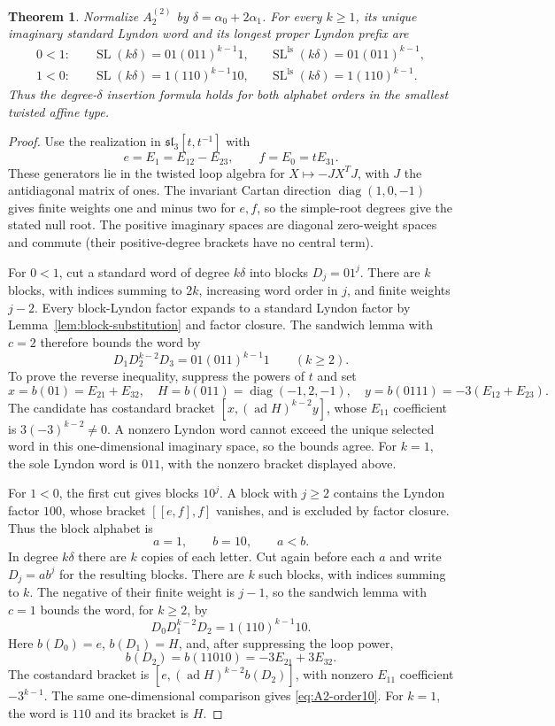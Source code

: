 \documentclass[11pt]{amsart}
\numberwithin{equation}{section}
\newtheorem{theorem}{Theorem}[section]
\theoremstyle{definition}
\DeclareMathOperator{\SL}{SL}
\DeclareMathOperator{\diag}{diag}
\DeclareMathOperator{\ad}{ad}
\newcommand{\br}[1]{b(#1)}
\newcommand{\ls}{\mathrm{ls}}
\begin{document}
\begin{theorem}\label{thm:A2twisted}
Normalize $A_2^{(2)}$ by $\delta=\alpha_0+2\alpha_1$. For every $k\geq1$, its unique imaginary standard Lyndon word and its longest proper Lyndon prefix are
\begin{align}
 0<1:
 &\quad\SL(k\delta)=01(011)^{k-1}1,
 &&\SL^{\ls}(k\delta)=01(011)^{k-1},\label{eq:A2-order01}\\
 1<0:
 &\quad\SL(k\delta)=1(110)^{k-1}10,
 &&\SL^{\ls}(k\delta)=1(110)^{k-1}.
 \label{eq:A2-order10}
\end{align}
Thus the degree-$\delta$ insertion formula holds for both alphabet orders in the smallest twisted affine type.
\end{theorem}
\begin{proof}
Use the realization in $\mathfrak{sl}_3[t,t^{-1}]$ with
\[
 e=E_1=E_{12}-E_{23},\qquad f=E_0=tE_{31}.
\]
These generators lie in the twisted loop algebra for $X\mapsto-JX^TJ$, with $J$ the antidiagonal matrix of ones. The invariant Cartan direction $\diag(1,0,-1)$ gives finite weights one and minus two for $e,f$, so the simple-root degrees give the stated null root. The positive imaginary spaces are diagonal zero-weight spaces and commute (their positive-degree brackets have no central term).

For $0<1$, cut a standard word of degree $k\delta$ into blocks $D_j=01^j$. There are $k$ blocks, with indices summing to $2k$, increasing word order in $j$, and finite weights $j-2$. Every block-Lyndon factor expands to a standard Lyndon factor by Lemma~\ref{lem:block-substitution} and factor closure. The sandwich lemma with $c=2$ therefore bounds the word by
\[
 D_1D_2^{k-2}D_3=01(011)^{k-1}1
 \qquad(k\geq2).
\]
To prove the reverse inequality, suppress the powers of $t$ and set
\[
 x=\br{01}=E_{21}+E_{32},\quad
 H=\br{011}=\diag(-1,2,-1),\quad
 y=\br{0111}=-3(E_{12}+E_{23}).
\]
The candidate has costandard bracket $[x,(\ad H)^{k-2}y]$, whose $E_{11}$ coefficient is $3(-3)^{k-2}\ne0$. A nonzero Lyndon word cannot exceed the unique selected word in this one-dimensional imaginary space, so the bounds agree. For $k=1$, the sole Lyndon word is $011$, with the nonzero bracket displayed above.

For $1<0$, the first cut gives blocks $10^j$. A block with $j\geq2$ contains the Lyndon factor $100$, whose bracket $[[e,f],f]$ vanishes, and is excluded by factor closure. Thus the block alphabet is
\[
 a=1,\qquad b=10,\qquad a<b.
\]
In degree $k\delta$ there are $k$ copies of each letter. Cut again before each $a$ and write $D_j=ab^j$ for the resulting blocks. There are $k$ such blocks, with indices summing to $k$. The negative of their finite weight is $j-1$, so the sandwich lemma with $c=1$ bounds the word, for $k\geq2$, by
\[
 D_0D_1^{k-2}D_2=1(110)^{k-1}10.
\]
Here $\br{D_0}=e$, $\br{D_1}=H$, and, after suppressing the loop power,
\[
 \br{D_2}=\br{11010}=-3E_{21}+3E_{32}.
\]
The costandard bracket is $[e,(\ad H)^{k-2}\br{D_2}]$, with nonzero $E_{11}$ coefficient $-3^{k-1}$. The same one-dimensional comparison gives \eqref{eq:A2-order10}. For $k=1$, the word is $110$ and its bracket is $H$.


\end{proof}
\end{document}
